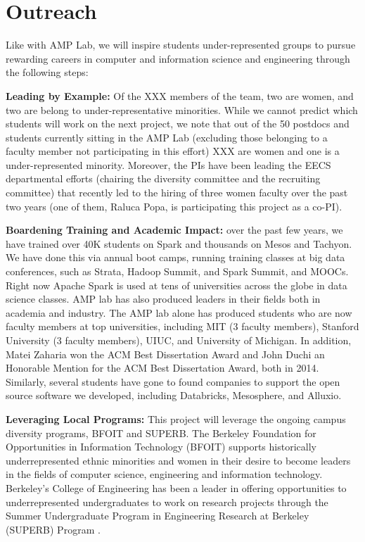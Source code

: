 \section{Outreach}

Like with AMP Lab, we will inspire students under-represented groups to pursue rewarding careers in computer and information science and engineering through the following steps:

{\bf Leading by Example:} Of the XXX members of the  team, two are women, and two are belong to under-representative minorities.  While we cannot predict which students will work on the next project, we note that out of the 50 postdocs and students currently sitting in the AMP Lab (excluding those belonging to a faculty member not participating in this effort) XXX are women and one is a under-represented minority.  Moreover, the PIs have been leading the EECS departmental efforts (chairing the diversity committee and the recruiting committee) that recently led to the hiring of three women faculty over the past two years (one of them, Raluca Popa, is participating this project as a co-PI).

{\bf Boardening Training and Academic Impact:} over the past few years, we have trained over 40K students on Spark and thousands on Mesos and Tachyon. We have done this via annual boot camps, running training classes at big data conferences, such as Strata, Hadoop Summit, and Spark Summit, and MOOCs.  Right now Apache Spark is used at tens of universities across the globe in data science classes. AMP lab has also produced leaders in their fields both in academia and  industry. The AMP lab alone has produced students who are now faculty members at top universities, including MIT (3 faculty members), Stanford University (3 faculty members), UIUC, and University of Michigan. In addition, Matei Zaharia won the ACM Best Dissertation Award and John Duchi an Honorable Mention for the ACM Best Dissertation Award, both in 2014. Similarly, several students have gone to found companies to support the open source software we developed, including Databricks, Mesosphere, and Alluxio. 

{\bf Leveraging  Local Programs:} This project will leverage the ongoing campus diversity programs, BFOIT and SUPERB. The Berkeley Foundation for Opportunities in Information Technology (BFOIT) \cite{bfoit} supports historically underrepresented ethnic minorities and women in their desire to become leaders in the fields of computer science, engineering and information technology. 
Berkeley's College of Engineering has been a leader in offering opportunities to underrepresented undergraduates to work on research projects through the Summer Undergraduate Program in Engineering Research at Berkeley (SUPERB) Program \cite{superb}.  

